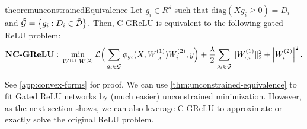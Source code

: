 \begin{restatable}{theorem}{unconstrainedEquivalence}\label{thm:unconstrained-equivalence}
    Let \( g_i \in R^d \) such that \(\text{diag}(X g_i \geq 0) = D_i \) and \(
    \tilde {\mathcal{G}} = \left\{g_i : D_i \in \tilde {\mathcal{D}}\right\} \).
    Then, C-GReLU is equivalent to the following gated ReLU problem:
    \begin{equation}\label{convex-forms:eq:gated-relu-mlp}
        \textbf{NC-GReLU}: \, \min_{W^{(1)}, W^{(2)}} \mathcal{L}\Big(\sum_{g_i \in \tilde {\mathcal{G}}}
        \phi_{g_i}(X, W^{(1)}_{\cdot, i})W^{(2)}_{i}, y\Big) + \frac{\lambda}{2}
        \sum_{g_i \in \tilde {\mathcal{G}}} \|W^{(1)}_{\cdot, i}\|_2^2 + \left\vert W^{(2)}_{i}\right\vert^2.
    \end{equation}
\end{restatable}
See \cref{app:convex-forms} for proof.
We can use \cref{thm:unconstrained-equivalence} to fit Gated ReLU networks by (much easier) unconstrained minimization.
However, as the next section shows, we can also leverage C-GReLU to approximate or exactly solve the original ReLU problem.
